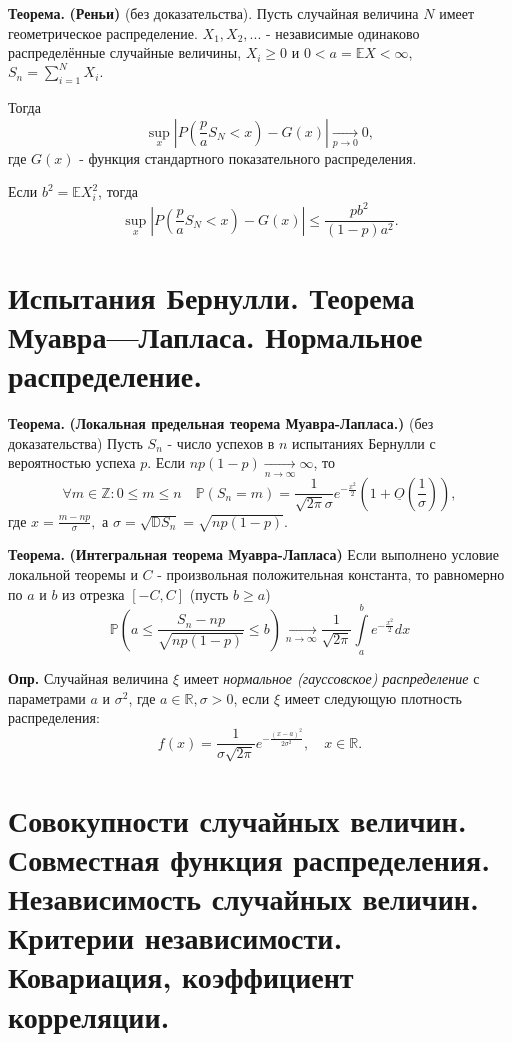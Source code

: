 \documentclass[oneside,final,14pt]{extreport}
\newcommand\mydef{{\bf Опр.}}
\newcommand\myth{{\bf Теорема.}}
\theoremstyle{definition}
\begin{document}
\myth{} \textbf{(Реньи)} (без доказательства). Пусть случайная величина $N$ имеет геометрическое распределение. $X_1, X_2, ...$ - независимые одинаково распределённые случайные величины, $X_i \geqslant 0$ и $0 < a = \mathbb{E}X < \infty$, $S_n = \sum\limits_{i=1}^N X_i.$

Тогда $$\sup _{x}\left|P\left(\frac{p}{a} S_{N}<x\right)-G(x)\right| \underset{p \rightarrow 0}{\longrightarrow} 0,$$
где $G(x)$ - функция стандартного показательного распределения.

Если $b^2 = \mathbb{E}X_i^2$, тогда $$\sup_{x}\left|P\left(\frac{p}{a} S_{N}<x\right)-G(x)\right| \leqslant \frac{p b^{2}}{(1-p) a^{2}}.$$
 
\section{Испытания Бернулли. Теорема Муавра—Лапласа. Нормальное распределение.}

\myth{} \textbf{(Локальная предельная теорема Муавра-Лапласа.)} (без доказательства) Пусть $S_n$ - число успехов в $n$ испытаниях Бернулли с вероятностью успеха $p$. Если $n p(1-p) \underset{n \to \infty}{\longrightarrow} \infty$, то
$$\forall m \in \mathbb{Z}: 0 \leqslant m \leqslant n \quad \mathbb{P}\left(S_{n}=m\right)=\frac{1}{\sqrt{2 \pi} \sigma} e^{-\frac{x^{2}}{2}}\left(1+\underline{O}\left(\frac{1}{\sigma}\right)\right),$$
где $x = \frac{m - np}{\sigma},$ а $\sigma=\sqrt{\mathbb{D} S_{n}}=\sqrt{n p(1-p)}$.

\myth{} \textbf{(Интегральная теорема Муавра-Лапласа)} Если выполнено условие локальной теоремы и $C$ - произвольная положительная константа, то равномерно по $a$ и $b$ из отрезка $[-C,C]$ (пусть $b \geqslant a$)
$$\mathbb{P}\left(a \leqslant \frac{S_{n}-n p}{\sqrt{n p(1-p)}} \leqslant b\right) \underset{n \to \infty}{\longrightarrow} \frac{1}{\sqrt{2 \pi}} \int\limits_{a}^{b} e^{-\frac{x^{2}}{2}} d x$$

\mydef{} Случайная величина $\xi$ имеет {\it нормальное (гауссовское) распределение} с параметрами $a$ и $\sigma^2$, где $a \in \mathbb{R}, \sigma > 0$, если $\xi$ имеет следующую плотность распределения: 
$$f(x)=\frac{1}{\sigma \sqrt{2 \pi}} e^{-\frac{(x-a)^{2}}{2 \sigma^{2}}}, \quad x \in \mathbb{R}.$$

\section{Совокупности случайных величин. Совместная функция распределения. Независимость случайных величин. Критерии независимости. Ковариация, коэффициент корреляции.}
\end{document}
